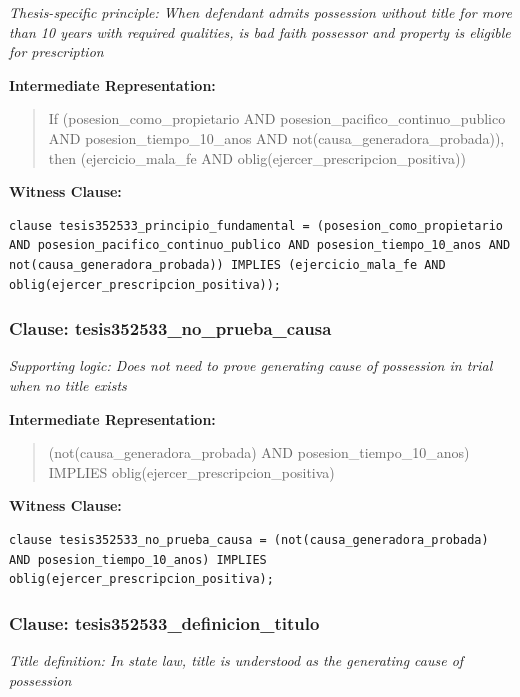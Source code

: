 \documentclass[11pt,a4paper]{article}
\begin{document}
\textit{Thesis-specific principle: When defendant admits possession without title for more than 10 years with required qualities, is bad faith possessor and property is eligible for prescription}

\textbf{Intermediate Representation:}

\begin{quote}
If (posesion\_como\_propietario AND posesion\_pacifico\_continuo\_publico AND posesion\_tiempo\_10\_anos AND not(causa\_generadora\_probada)), then (ejercicio\_mala\_fe AND oblig(ejercer\_prescripcion\_positiva))
\end{quote}

\textbf{Witness Clause:}

\begin{lstlisting}[style=witnessstyle, language=Witness]
clause tesis352533_principio_fundamental = (posesion_como_propietario AND posesion_pacifico_continuo_publico AND posesion_tiempo_10_anos AND not(causa_generadora_probada)) IMPLIES (ejercicio_mala_fe AND oblig(ejercer_prescripcion_positiva));
\end{lstlisting}

\subsubsection{Clause: tesis352533\_no\_prueba\_causa}

\textit{Supporting logic: Does not need to prove generating cause of possession in trial when no title exists}

\textbf{Intermediate Representation:}

\begin{quote}
(not(causa\_generadora\_probada) AND posesion\_tiempo\_10\_anos) IMPLIES oblig(ejercer\_prescripcion\_positiva)
\end{quote}

\textbf{Witness Clause:}

\begin{lstlisting}[style=witnessstyle, language=Witness]
clause tesis352533_no_prueba_causa = (not(causa_generadora_probada) AND posesion_tiempo_10_anos) IMPLIES oblig(ejercer_prescripcion_positiva);
\end{lstlisting}

\subsubsection{Clause: tesis352533\_definicion\_titulo}

\textit{Title definition: In state law, title is understood as the generating cause of possession}
\end{document}
